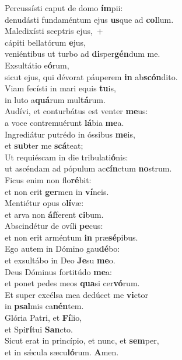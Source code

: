 \evenverse Percussísti caput de domo \textbf{ím}pii:~\*\\
\evenverse denudásti fundaméntum ejus \textbf{us}que ad \textbf{col}lum.\\
\oddverse Maledixísti sceptris ejus,~+\\
\oddverse  cápiti bellatórum \textbf{e}jus,~\*\\
\oddverse veniéntibus ut turbo ad \textbf{di}sper\textbf{gén}dum me.\\
\evenverse Exsultátio e\textbf{ó}rum,~\*\\
\evenverse sicut ejus, qui dévorat páuperem \textbf{in} ab\textbf{scón}dito.\\
\oddverse Viam fecísti in mari equis \textbf{tu}is,~\*\\
\oddverse in luto a\textbf{quá}rum mul\textbf{tá}rum.\\
\evenverse Audívi, et conturbátus est venter \textbf{me}us:~\*\\
\evenverse a voce contremuérunt \textbf{lá}bia \textbf{me}a.\\
\oddverse Ingrediátur putrédo in óssibus \textbf{me}is,~\*\\
\oddverse et \textbf{sub}ter me \textbf{scá}teat;\\
\evenverse Ut requiéscam in die tribulati\textbf{ó}nis:~\*\\
\evenverse ut ascéndam ad pópulum ac\textbf{cín}ctum \textbf{no}strum.\\
\oddverse Ficus enim non flo\textbf{ré}bit:~\*\\
\oddverse et non erit \textbf{ger}men in \textbf{ví}neis.\\
\evenverse Mentiétur opus o\textbf{lí}væ:~\*\\
\evenverse et arva non \textbf{áf}ferent \textbf{ci}bum.\\
\oddverse Abscindétur de ovíli \textbf{pe}cus:~\*\\
\oddverse et non erit arméntum \textbf{in} præ\textbf{sé}pibus.\\
\evenverse Ego autem in Dómino gau\textbf{dé}bo:~\*\\
\evenverse et exsultábo in Deo \textbf{Je}su \textbf{me}o.\\
\oddverse Deus Dóminus fortitúdo \textbf{me}a:~\*\\
\oddverse et ponet pedes meos \textbf{qua}si cer\textbf{vó}rum.\\
\evenverse Et super excélsa mea dedúcet me \textbf{vi}ctor~\*\\
\evenverse in \textbf{psal}mis ca\textbf{nén}tem.\\
\oddverse Glória Patri, et \textbf{Fí}lio,~\*\\
\oddverse et Spi\textbf{rí}tui \textbf{San}cto.\\
\evenverse Sicut erat in princípio, et nunc, et \textbf{sem}per,~\*\\
\evenverse et in sǽcula sæcu\textbf{ló}rum. \textbf{A}men.\\
